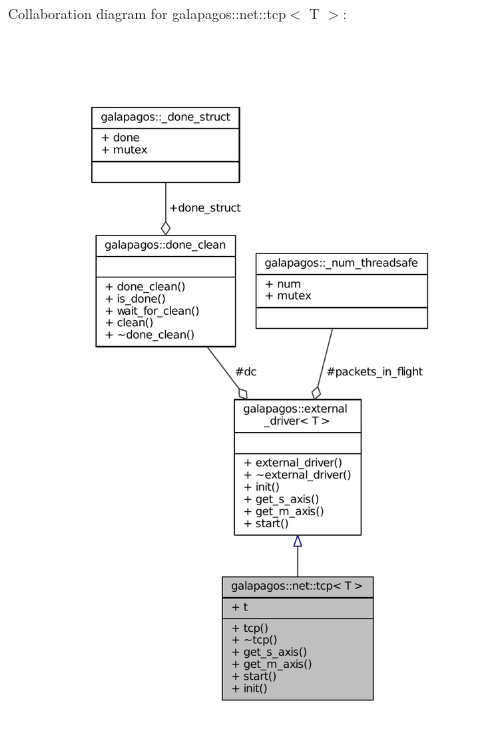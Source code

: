 Collaboration diagram for galapagos\+:\+:net\+:\+:tcp$<$ T $>$\+:
\nopagebreak
\begin{figure}[H]
\begin{center}
\leavevmode
\includegraphics[height=550pt]{classgalapagos_1_1net_1_1tcp__coll__graph}
\end{center}
\end{figure}
